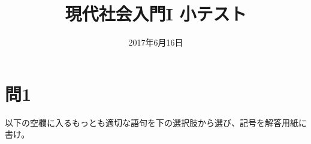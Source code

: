 \documentclass[uplatex,dvipdfmx]{jsarticle}
\author{}
\date{2017年6月16日}
\title{現代社会入門I 小テスト}
\begin{document}
\maketitle

\setcounter{qnumber}{1}
\def\anaume{\hspace{.5zw}\framebox[1.5cm]{\bf \theqnumber}\hspace{.5zw}\stepcounter{qnumber}}

\setcounter{anumber}{1}
\newcommand\sentakusi[1]{{{{\bf \Alph{anumber}}~#1}\hspace{1zw}} \stepcounter{anumber}}


\section*{問1}

以下の空欄に入るもっとも適切な語句を下の選択肢から選び、記号を解答用紙に書け。
\end{document}
